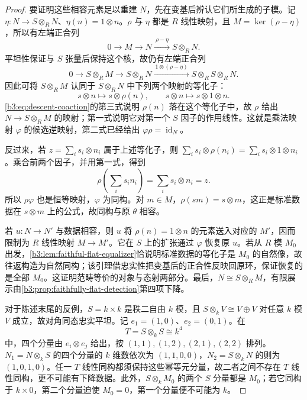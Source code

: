 \begin{proof}
	要证明这些相容元素足以重建 \(N\)，先在变基后辨认它们所生成的子模。记 \(\eta:N\to S\otimes_RN\)、\(\eta(n)=1\otimes n\)。\(\rho\) 与 \(\eta\) 都是 \(R\) 线性映射，且 \(M=\ker(\rho-\eta)\)，所以有左端正合列
	\[
		0\longrightarrow M\longrightarrow N \xrightarrow{\ \rho-\eta\ }S\otimes_RN.
	\]
	平坦性保证与 \(S\) 张量后保持这个核，故仍有左端正合列
	\[
		0\longrightarrow S\otimes_RM\longrightarrow S\otimes_RN \xrightarrow{\ 1\otimes(\rho-\eta)\ }S\otimes_RS\otimes_RN.
	\]
	因此可将 \(S\otimes_RM\) 认同于 \(S\otimes_RN\) 中下列两个映射的等化子：
	\[
		s\otimes n\longmapsto s\otimes\rho(n),\qquad s\otimes n\longmapsto s\otimes1\otimes n.
	\]
	\eqref{b3:eq:descent-coaction}的第三式说明 \(\rho(n)\) 落在这个等化子中，故 \(\rho\) 给出 \(N\to S\otimes_RM\) 的映射；第一式说明它对第一个 \(S\) 因子的作用线性。这就是乘法映射 \(\varphi\) 的候选逆映射，第二式已经给出 \(\varphi\rho=\operatorname{id}_N\)。

	反过来，若 \(z=\sum_i s_i\otimes n_i\) 属于上述等化子，则 \(\sum_i s_i\otimes\rho(n_i)=\sum_i s_i\otimes1\otimes n_i\)。乘合前两个因子，并用第一式，得到
	\[
		\rho\left(\sum_i s_in_i\right)=\sum_i s_i\otimes n_i=z.
	\]
	所以 \(\rho\varphi\) 也是恒等映射，\(\varphi\) 为同构。对 \(m\in M\)，\(\rho(sm)=s\otimes m\)，这正是标准数据在 \(s\otimes m\) 上的公式，故同构与原 \(\theta\) 相容。

	若 \(u:N\to N'\) 与数据相容，则 \(u\) 将 \(\rho(n)=1\otimes n\) 的元素送入对应的 \(M'\)，因而限制为 \(R\) 线性映射 \(M\to M'\)。它在 \(S\) 上的扩张通过 \(\varphi\) 恢复原 \(u\)。若从 \(R\) 模 \(M_0\) 出发，\cref{b3:lem:faithful-flat-equalizer}恰说明标准数据的等化子是 \(M_0\) 的自然像，故往返构造为自然同构；该引理借忠实性把变基后的正合性反映回原环，保证恢复的是全部 \(M_0\)。这证明范畴等价的对象与态射两部分。最后，\(N\cong S\otimes_RM\)，有限展示由\cref{b3:prop:faithfully-flat-detection}第四项下降。

	对于陈述末尾的反例，\(S=k\times k\) 是秩二自由 \(k\) 模，且 \(S\otimes_kV\cong V\oplus V\) 对任意 \(k\) 模 \(V\) 成立，故对角同态忠实平坦。记 \(e_1=(1,0)\)、\(e_2=(0,1)\)。在
	\[
		T=S\otimes_kS\cong k^4
	\]
	中，四个分量由 \(e_i\otimes e_j\) 给出，按 \((1,1),(1,2),(2,1),(2,2)\) 排列。\(N_1=N\otimes_kS\) 的四个分量的 \(k\) 维数依次为 \((1,1,0,0)\)，\(N_2=S\otimes_kN\) 的则为 \((1,0,1,0)\)。任一 \(T\) 线性同构都须保持这些幂等元分量，故二者之间不存在 \(T\) 线性同构，更不可能有下降数据。此外，\(S\otimes_kM_0\) 的两个 \(S\) 分量都是 \(M_0\)；若它同构于 \(k\times0\)，第二个分量迫使 \(M_0=0\)，第一个分量便不可能为 \(k\)。
\end{proof}

